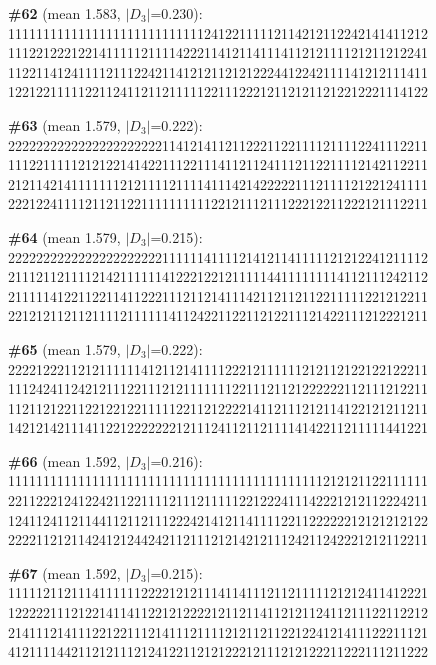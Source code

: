 \documentclass[10pt]{article}
\begin{document}
\noindent\textbf{\#62} (mean 1.583, $|D_3|$=0.230):\\
111111111111111111111111111124122111112114212112242141411212\\
111221222122141111121111422211412114111411212111121211212241\\
112211412411112111224211412121121212224412242111141212111411\\
122122111112211241121121111122111222121121211212212221114122\medskip

\noindent\textbf{\#63} (mean 1.579, $|D_3|$=0.222):\\
222222222222222222222211412141121122211221111211112241112211\\
111221111121212214142211122111411211241112112211112142112211\\
212114214111111121211112111141114214222221112111121221241111\\
222122411112112112211111111112212111211122212211222121112211\medskip

\noindent\textbf{\#64} (mean 1.579, $|D_3|$=0.215):\\
222222222222222222222211111141111214121141111121212241211112\\
211121121111214211111141222122121111144111111114112111242112\\
211111412211221141122211121121411142112112112211111221212211\\
221212112112111121111114112422112211212211121422111212221211\medskip

\noindent\textbf{\#65} (mean 1.579, $|D_3|$=0.222):\\
222212221121211111141211214111122212111111212112122122122211\\
111242411242121112211121211111112211121121222222112111212211\\
112112122112212212211111221121222214112111212114122121211211\\
142121421114112212222222121112411211211114142211211111441221\medskip

\noindent\textbf{\#66} (mean 1.592, $|D_3|$=0.216):\\
111111111111111111111111111111111111111111111212121122111111\\
221122212412242112211112111211111221222411142221212112224211\\
124112411211441121121112224214121141111221122222212121212122\\
222211212114241212442421121112121421211124211242221212112211\medskip

\noindent\textbf{\#67} (mean 1.592, $|D_3|$=0.215):\\
111112112111411111122221212111411411121121111121212411412221\\
122222111212214114112212122221211211411212112411211122112212\\
214111214111221221112141112111121211211221224121411122211121\\
412111144211212111212412211212122212111212122211222111211222\medskip
\end{document}
